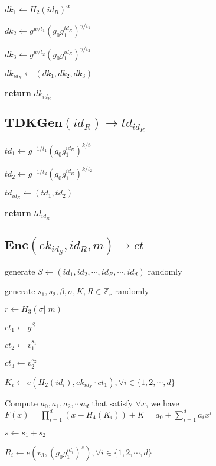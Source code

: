 \documentclass[a4paper]{article}
\begin{document}
$\textit{dk}_1 \gets H_2(\textit{id}_R)^\alpha$

$\textit{dk}_2 \gets g^{w / t_1} (g_0 g_1^{\textit{id}_R})^{\gamma / t_1}$

$\textit{dk}_3 \gets g^{w / t_2} (g_0 g_1^{\textit{id}_R})^{\gamma / t_2}$

$\textit{dk}_{\textit{id}_R} \gets (\textit{dk}_1, \textit{dk}_2, \textit{dk}_3)$

\textbf{return} $\textit{dk}_{\textit{id}_R}$

\subsection{$\textbf{TDKGen}(\textit{id}_R) \rightarrow \textit{td}_{\textit{id}_R}$}

$\textit{td}_1 \gets g^{-1 / t_1} (g_0 g_1^{\textit{id}_R})^{k / t_1}$

$\textit{td}_2 \gets g^{-1 / t_2} (g_0 g_1^{\textit{id}_R})^{k / t_2}$

$\textit{td}_{\textit{id}_R} \gets (\textit{td}_1, \textit{td}_2)$

\textbf{return} $\textit{td}_{\textit{id}_R}$

\subsection{$\textbf{Enc}(\textit{ek}_{\textit{id}_S}, \textit{id}_R, m) \rightarrow \textit{ct}$}

generate $S \gets (\textit{id}_1, \textit{id}_2, \cdots, \textit{id}_R, \cdots, \textit{id}_d)$ randomly

generate $s_1, s_2, \beta, \sigma, K, R \in \mathbb{Z}_r$ randomly

$r \gets H_3(\sigma || m)$

$\textit{ct}_1 \gets g^\beta$

$\textit{ct}_2 \gets v_1^{s_1}$

$\textit{ct}_3 \gets v_2^{s_2}$

$K_i \gets e(H_2(\textit{id}_i), ek_{\textit{id}_S} \cdot \textit{ct}_1), \forall i \in \{1, 2, \cdots, d\}$

Compute $a_0, a_1, a_2, \cdots a_d$ that satisfy $\forall x$, we have $F(x) = \prod\limits_{i = 1}^d (x - H_4(K_i)) + K = a_0 + \sum\limits_{i = 1}^d a_i x^i$

$s \gets s_1 + s_2$

$R_i \gets e(v_3, (g_0 g_1^{\textit{id}_i})^s), \forall i \in \{1, 2, \cdots, d\}$
\end{document}
